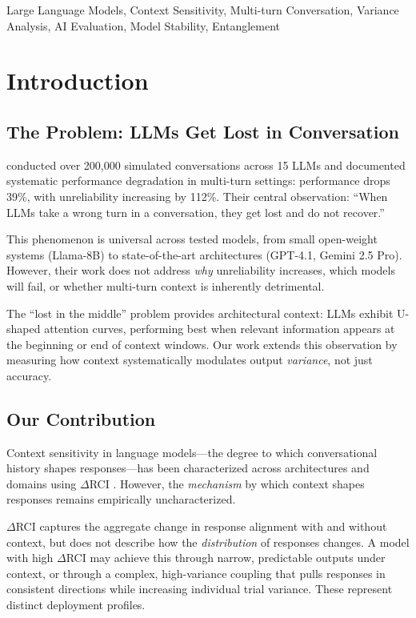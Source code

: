 \documentclass[twoside,11pt]{article}
\begin{document}
\begin{keywords}
  Large Language Models, Context Sensitivity, Multi-turn Conversation, Variance Analysis, AI Evaluation, Model Stability, Entanglement
\end{keywords}

\section{Introduction}

\subsection{The Problem: LLMs Get Lost in Conversation}

\citet{laban2025lost} conducted over 200,000 simulated conversations across 15 LLMs and documented systematic performance degradation in multi-turn settings: performance drops 39\%, with unreliability increasing by 112\%. Their central observation: ``When LLMs take a wrong turn in a conversation, they get lost and do not recover.''

This phenomenon is universal across tested models, from small open-weight systems (Llama-8B) to state-of-the-art architectures (GPT-4.1, Gemini 2.5 Pro). However, their work does not address \emph{why} unreliability increases, which models will fail, or whether multi-turn context is inherently detrimental.

The ``lost in the middle'' problem \citep{liu2024lost} provides architectural context: LLMs exhibit U-shaped attention curves, performing best when relevant information appears at the beginning or end of context windows. Our work extends this observation by measuring how context systematically modulates output \emph{variance}, not just accuracy.

\subsection{Our Contribution}

Context sensitivity in language models---the degree to which conversational history shapes responses---has been characterized across architectures and domains using $\Delta$RCI \citep{laxman2026paper1, laxman2026paper2}. However, the \emph{mechanism} by which context shapes responses remains empirically uncharacterized.

$\Delta$RCI captures the aggregate change in response alignment with and without context, but does not describe how the \emph{distribution} of responses changes. A model with high $\Delta$RCI may achieve this through narrow, predictable outputs under context, or through a complex, high-variance coupling that pulls responses in consistent directions while increasing individual trial variance. These represent distinct deployment profiles.
\end{document}
